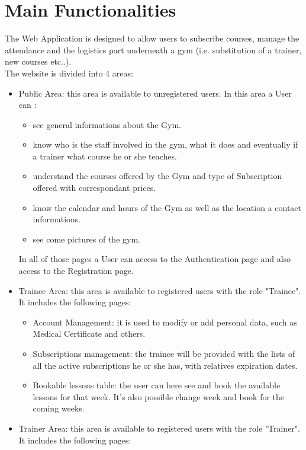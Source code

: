 \section{Main Functionalities}

The Web Application is designed to allow users to subscribe courses, manage the attendance and the logistics part underneath a gym (i.e. substitution of a trainer, new courses etc..).\\
The website is divided into 4 areas:

\begin{itemize}
	\item Public Area: this area is available to unregistered users. In this area a User can :
	\begin{itemize}
		\item see general informations about the Gym.
		\item know who is the staff involved in the gym, what it does and eventually if a trainer what course he or she teaches.
		\item understand the courses offered by the Gym and type of Subscription offered with correspondant prices.
		\item know the calendar and hours of the Gym as well as the location a contact informations.
		\item see come pictures of the gym.
	\end{itemize}	 
	In all of those pages a User can access to the Authentication page and also access to the Registration page. 
	\item Trainee Area: this area is available to registered users with the role "Trainee". It includes the following pages:
	\begin{itemize}
		\item Account Management: it is used to modify or add personal data, such as Medical Certificate and others.
		\item Subscriptions management: the trainee will be provided with the lists of all the active subscriptions he or she has, with relatives expiration dates.
		\item Bookable lessons table: the user can here see and book the available lessons for that week. It's also possible change week and book for the coming weeks.
	\end{itemize}
	\item Trainer Area: this area is available to registered users with the role "Trainer". It includes the following pages:

\end{itemize}
